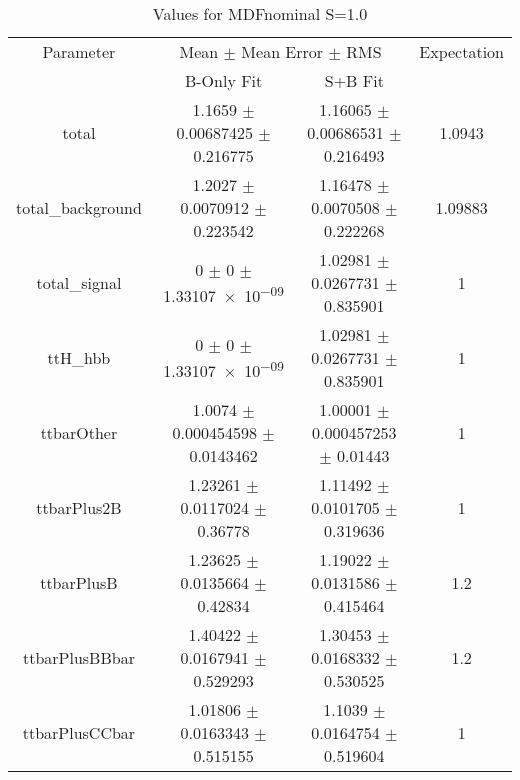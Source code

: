 \begin{table}
\centering
\caption{Values for MDFnominal S=1.0}
\begin{tabular}{cccc}
\toprule
Parameter & \multicolumn{2}{c}{Mean $\pm$ Mean Error $\pm$ RMS} & Expectation\\
 & B-Only Fit & S+B Fit & \\
\midrule
total & \num{1.1659} $\pm$ \num{0.00687425} $\pm$ \num{0.216775} & \num{1.16065} $\pm$ \num{0.00686531} $\pm$ \num{0.216493} & \num{1.0943}\\
total\_background & \num{1.2027} $\pm$ \num{0.0070912} $\pm$ \num{0.223542} & \num{1.16478} $\pm$ \num{0.0070508} $\pm$ \num{0.222268} & \num{1.09883}\\
total\_signal & \num{0} $\pm$ \num{0} $\pm$ \num{1.33107e-09} & \num{1.02981} $\pm$ \num{0.0267731} $\pm$ \num{0.835901} & \num{1}\\
ttH\_hbb & \num{0} $\pm$ \num{0} $\pm$ \num{1.33107e-09} & \num{1.02981} $\pm$ \num{0.0267731} $\pm$ \num{0.835901} & \num{1}\\
ttbarOther & \num{1.0074} $\pm$ \num{0.000454598} $\pm$ \num{0.0143462} & \num{1.00001} $\pm$ \num{0.000457253} $\pm$ \num{0.01443} & \num{1}\\
ttbarPlus2B & \num{1.23261} $\pm$ \num{0.0117024} $\pm$ \num{0.36778} & \num{1.11492} $\pm$ \num{0.0101705} $\pm$ \num{0.319636} & \num{1}\\
ttbarPlusB & \num{1.23625} $\pm$ \num{0.0135664} $\pm$ \num{0.42834} & \num{1.19022} $\pm$ \num{0.0131586} $\pm$ \num{0.415464} & \num{1.2}\\
ttbarPlusBBbar & \num{1.40422} $\pm$ \num{0.0167941} $\pm$ \num{0.529293} & \num{1.30453} $\pm$ \num{0.0168332} $\pm$ \num{0.530525} & \num{1.2}\\
ttbarPlusCCbar & \num{1.01806} $\pm$ \num{0.0163343} $\pm$ \num{0.515155} & \num{1.1039} $\pm$ \num{0.0164754} $\pm$ \num{0.519604} & \num{1}\\
\bottomrule
\end{tabular}
\end{table}